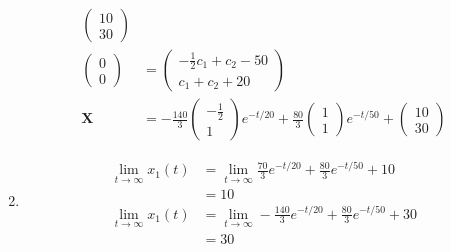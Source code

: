 \documentclass{article}
\begin{document}
\begin{enumerate}
\begin{align*}
\begin{pmatrix}
                                                                      10 \\
                                                                      30
                                                                    \end{pmatrix}                                               \\
          \begin{pmatrix}
            0 \\
            0
          \end{pmatrix} & = \begin{pmatrix}
                              -\frac{1}{2} c_1 + c_2 - 50 \\
                              c_1 + c_2 + 20
                            \end{pmatrix}                                                                          \\
          \mathbf{X}      & = -\frac{140}{3} \begin{pmatrix}
                                               -\frac{1}{2} \\
                                               1
                                             \end{pmatrix} e^{-t / 20} + \frac{80}{3} \begin{pmatrix}
                                                                                        1 \\
                                                                                        1
                                                                                      \end{pmatrix} e^{-t / 50} + \begin{pmatrix}
                                                                                                                    10 \\
                                                                                                                    30
                                                                                                                  \end{pmatrix}
        \end{align*}

  \item

        \begin{align*}
          \lim_{t \rightarrow \infty} x_1(t) & = \lim_{t \rightarrow \infty} \frac{70}{3} e^{-t / 20} + \frac{80}{3} e^{-t / 50} + 10   \\
                                             & = 10                                                                                     \\
          \lim_{t \rightarrow \infty} x_1(t) & = \lim_{t \rightarrow \infty} -\frac{140}{3} e^{-t / 20} + \frac{80}{3} e^{-t / 50} + 30 \\
                                             & = 30
        \end{align*}
\end{enumerate}
\end{document}
